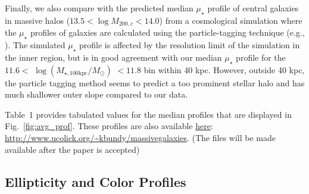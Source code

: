 \documentclass[a4paper,fleqn,usenatbib]{mnras}
\def\logmtot{{$\log (M_{\star,100\mathrm{kpc}}/M_{\odot})$}}
\def\mden{{$\mu_{\star}$}}
\begin{document}
    Finally, we also compare with the predicted median \mden{} profile of central 
    galaxies in massive halos ($13.5 < \log M_{200,c} < 14.0$) from a cosmological 
    simulation where the \mden{} profiles of galaxies are calculated using the 
    particle-tagging technique (e.g., \citealt{Cooper2010}). 
    The simulated \mden{} profile is affected by the resolution limit of the simulation 
    in the inner region, but is in good agreement with our median \mden{} profile for 
    the $11.6 <$ \logmtot{} $< 11.8$ bin within 40 kpc. 
    However, outside 40 kpc, the particle tagging method seems to predict a too 
    prominent stellar halo and has much shallower outer slope compared to our data. 
    
    Table~1 provides tabulated values for the median profiles that are 
    displayed in Fig.~\ref{fig:avg_prof}. 
    These profiles are also available  
    \href{http://www.ucolick.org/\~kbundy/massivegalaxies}{here}:
    {\url{http://www.ucolick.org/\~kbundy/massivegalaxies}}. (The files will be made 
    available after the paper is accepted)
    

\subsection{Ellipticity and Color Profiles}
    \label{ssec:ell_color}
    
\end{document}
